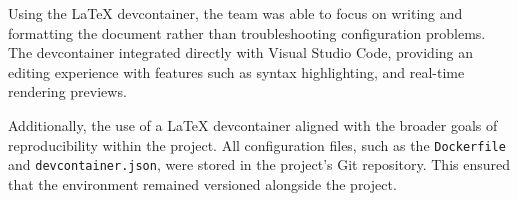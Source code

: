 Using the LaTeX devcontainer, the team was able to focus on writing and
formatting the document rather than troubleshooting configuration problems. The
devcontainer integrated directly with Visual Studio Code, providing an editing
experience with features such as syntax highlighting, and real-time rendering
previews.

Additionally, the use of a LaTeX devcontainer aligned with the broader goals of
reproducibility within the project. All configuration files, such as the
\texttt{Dockerfile} and \texttt{devcontainer.json}, were stored in the project's
Git repository. This ensured that the environment remained versioned alongside
the project.


\newpage{}
